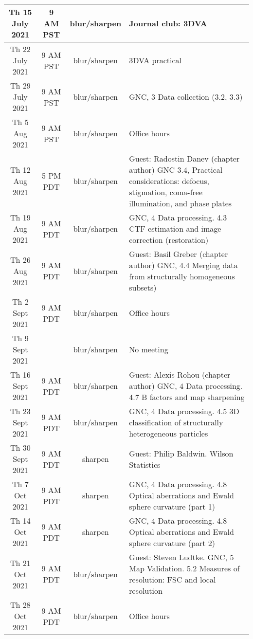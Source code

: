 \documentclass[11pt, oneside]{article}   	%
\begin{document}
\begin{center}
\begin{longtable}{|| c c c p{90mm} ||}
 \hline
Th 15 July 2021 & \tiny{9 AM PST} & blur/sharpen & Journal club: 3DVA \\
 \hline
Th 22 July 2021 & \tiny{9 AM PST} & blur/sharpen & 3DVA practical \\
 \hline
Th 29 July 2021 & \tiny{9 AM PST} & blur/sharpen & GNC, 3 Data collection (3.2, 3.3) \\
 \hline
Th 5 Aug 2021& \tiny{9 AM PST} & blur/sharpen & Office hours  \\ 
 \hline
Th 12 Aug 2021& \tiny{5 PM PDT} & blur/sharpen & \tiny{Guest: Radostin Danev (chapter author) GNC 3.4, Practical considerations: defocus, stigmation, coma-free illumination, and phase plates}  \\ 
 \hline
Th 19 Aug 2021& \tiny{9 AM PDT} & blur/sharpen & \tiny{GNC, 4 Data processing. 4.3 CTF estimation and image correction (restoration)} \\
 \hline
Th 26 Aug 2021& \tiny{9 AM PDT} & blur/sharpen &  \tiny{Guest: Basil Greber (chapter author) GNC, 4.4 Merging data from structurally homogeneous subsets)} \\ 
 \hline
Th 2 Sept 2021& \tiny{9 AM PDT} & blur/sharpen & Office hours  \\ 
 \hline
Th 9 Sept 2021&  & blur/sharpen & No meeting  \\ 
 \hline
Th 16 Sept 2021& \tiny{9 AM PDT} & blur/sharpen & \tiny{Guest: Alexis Rohou (chapter author) GNC, 4 Data processing. 4.7 B factors and map sharpening}  \\
 \hline
Th 23 Sept 2021& \tiny{9 AM PDT} & blur/sharpen & \tiny{GNC, 4 Data processing. 4.5 3D classification of structurally heterogeneous particles}  \\ %
 \hline
Th 30 Sept 2021& \tiny{9 AM PDT} & sharpen & \tiny{Guest: Philip Baldwin. Wilson Statistics}  \\ 
 \hline
  Th 7 Oct 2021& \tiny{9 AM PDT} & sharpen & \tiny{GNC, 4 Data processing. 4.8 Optical aberrations and Ewald sphere curvature (part 1)}  \\ 
 \hline
  Th 14 Oct 2021& \tiny{9 AM PDT} & sharpen & \tiny{GNC, 4 Data processing. 4.8 Optical aberrations and Ewald sphere curvature (part 2)}  \\ 
 \hline
Th 21 Oct 2021& \tiny{9 AM PDT} & blur/sharpen & \tiny{Guest: Steven Ludtke. GNC, 5 Map Validation. 5.2 Measures of resolution: FSC and local resolution}  \\ 
 \hline
Th 28 Oct 2021& \tiny{9 AM PDT} & blur/sharpen & Office hours   \\ 
 \hline

\end{longtable}
\end{center}
\end{document}
